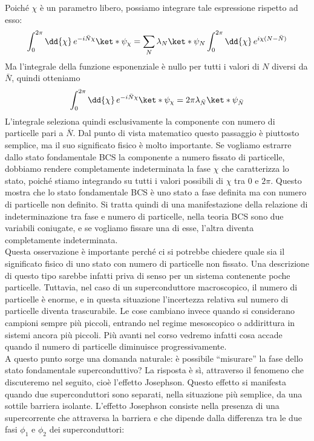 Poiché $\chi$ è un parametro libero, possiamo integrare tale espressione rispetto ad esso:
\begin{equation*}
   \int_0^{2\pi}
   \dd{\chi}\,
   e^{-i \bar{N} \chi}
   \ket*{\psi_{\chi}}
   =
   \sum_N
   \lambda_N
   \ket*{\psi_N}
   \int_0^{2\pi}
   \dd{\chi}\,
   e^{i\chi(N-\bar{N})}
\end{equation*}
Ma l'integrale della funzione esponenziale è nullo per tutti i valori di $N$ diversi da $\bar{N}$,
quindi otteniamo
\begin{equation*}
   \int_0^{2\pi}
   \dd{\chi}\,
   e^{-i \bar{N} \chi}
   \ket*{\psi_{\chi}}
   =
   2\pi \lambda_{\bar{N}}
   \ket*{\psi_{\bar{N}}}
\end{equation*}
L'integrale seleziona quindi esclusivamente la componente con numero di particelle pari a $\bar{N}$. Dal punto di vista matematico questo passaggio è piuttosto semplice, ma il suo significato fisico è molto importante. Se vogliamo estrarre dallo stato fondamentale BCS la componente a numero fissato di particelle, dobbiamo rendere completamente indeterminata la fase $\chi$ che caratterizza lo stato, poiché stiamo integrando su tutti i valori possibili di $\chi$ tra $0$ e $2\pi$. Questo mostra che lo stato fondamentale BCS è uno stato a fase definita ma con numero di particelle non definito. Si tratta quindi di una manifestazione della relazione di indeterminazione tra fase e numero di particelle, nella teoria BCS sono due variabili coniugate, e se vogliamo fissare una di esse, l'altra diventa completamente indeterminata.\\
Questa osservazione è importante perché ci si potrebbe chiedere quale sia il significato fisico di uno stato con numero di particelle non fissato. Una descrizione di questo tipo sarebbe infatti priva di senso per un sistema contenente poche particelle. Tuttavia, nel caso di un superconduttore macroscopico, il numero di particelle è enorme, e in questa situazione l'incertezza relativa sul numero di particelle diventa trascurabile. Le cose cambiano invece quando si considerano campioni sempre più piccoli, entrando nel regime mesoscopico o addirittura in sistemi ancora più piccoli. Più avanti nel corso vedremo infatti cosa accade quando il numero di particelle diminuisce progressivamente.\\
A questo punto sorge una domanda naturale: è possibile ``misurare'' la fase dello stato fondamentale superconduttivo? La risposta è sì, attraverso il fenomeno che discuteremo nel seguito, cioè l'effetto Josephson. Questo effetto si manifesta quando due superconduttori sono separati, nella situazione più semplice, da una sottile barriera isolante. L'effetto Josephson consiste nella presenza di una supercorrente che attraversa la barriera e che dipende dalla differenza tra le due fasi $\phi_1$ e $\phi_2$ dei superconduttori:
